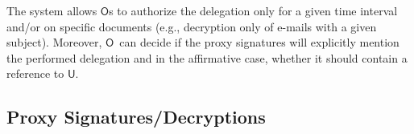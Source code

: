 \documentclass[preprint,authoryear,12pt]{elsarticle}
\newcommand{\Owner}{\ensuremath{\mathsf{O}}}
\newcommand{\User}{\ensuremath{\mathsf{U}}}
\newcommand{\Proxy}{\ensuremath{\mathsf{P}}}
\newcommand{\SC}{\ensuremath{\mathsf{SC}}}
\newcommand{\RSC}{\ensuremath{\mathsf{RSC}}}
\newcommand{\PRSC}{\ensuremath{\mathsf{PRSC}}}
\begin{document}
The system allows \Owner s to authorize the delegation only for a given time interval and/or on specific documents (e.g., decryption only of e-mails with a given subject). Moreover, \Owner\ can decide if the proxy signatures will explicitly mention the performed delegation and in the affirmative
case, whether it should contain a reference to \User. 

\subsection{Proxy Signatures/Decryptions} 
\end{document}
